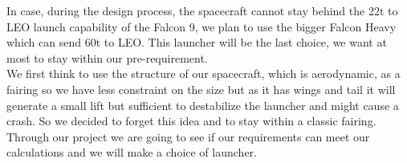 In case, during the design process, the spacecraft cannot stay behind the 22t to LEO launch capability of the Falcon 9, we plan to use the bigger Falcon Heavy which can send 60t to LEO. This launcher will be the last choice, we want at most to stay within our pre-requirement. \\

We first think to use the structure of our spacecraft, which is aerodynamic, as a fairing so we have less constraint on the size but as it has wings and tail it will generate a small lift but sufficient to destabilize the launcher and might cause a crash. So we decided to forget this idea and to stay within a classic fairing. \\

Through our project we are going to see if our requirements can meet our calculations and we will make a choice of launcher. 